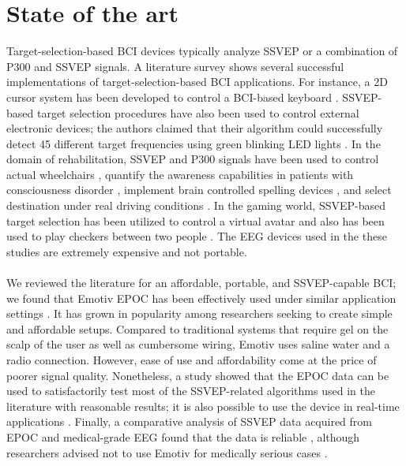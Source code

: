 \documentclass[smallextended]{svjour3}
\begin{document}
\section{State of the art}
\label{sec:soa}
Target-selection-based BCI devices typically analyze SSVEP or a combination of P300 and SSVEP signals. A literature survey shows several successful implementations of target-selection-based BCI applications. For instance, a 2D cursor system has been developed to control a BCI-based keyboard \cite{yin2015hybrid}. SSVEP-based target selection procedures have also been used to control external electronic devices; the authors claimed that their algorithm could successfully detect 45 different target frequencies using green blinking LED lights \cite{SSVEPfiability}. In the domain of rehabilitation, SSVEP and P300 signals have been used to control actual wheelchairs \cite{paper4}, quantify the awareness capabilities in patients with consciousness disorder \cite{paper8}, implement brain controlled spelling devices \cite{paper2}, and select destination under real driving conditions \cite{car}. In the gaming world, SSVEP-based target selection has been utilized to control a virtual avatar \cite{paper_5} and also has been used to play checkers between two people \cite{paper6}. The EEG devices used in the these studies are extremely expensive and not portable.\\
\\
We reviewed the literature for an affordable, portable, and SSVEP-capable BCI; we found that Emotiv EPOC has been effectively used under similar application settings \cite{jian2014improving,van2012designing}. It has grown in popularity among researchers seeking to create simple and affordable setups. 
Compared to traditional systems that require gel on the scalp of the user as well as cumbersome wiring, Emotiv uses saline water and a radio connection. However, ease of use and affordability come at the price of poorer signal quality.
Nonetheless, a study showed that the EPOC data can be used to satisfactorily test most of the SSVEP-related algorithms used in the literature with reasonable results; it is also possible to use the device in real-time applications \cite{hvaring2014comparison}.
Finally, a comparative analysis of SSVEP data acquired from EPOC and medical-grade EEG found that the data is reliable \cite{liu2012implementation}, although researchers advised not to use Emotiv for medically serious cases \cite{duvinage2013performance}.\\
\\
\end{document}
